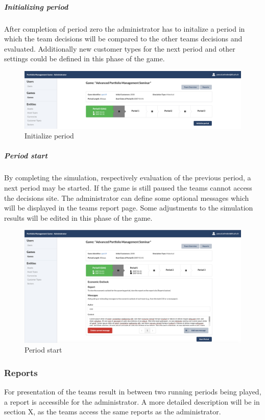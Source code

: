 \subparagraph{Initializing period}
After completion of period zero the administrator has to initalize a period in which the team decisions will be compared to the other teams decisions and evaluated. Additionally new customer types for the next period and other settings could be defined in this phase of the game.
\begin{figure}[h!]
  \centering
  \includegraphics[scale=0.2]{img/application-overview/administrator/08_period_initialization.png}
  \caption{Initialize period}
\end{figure}


\subparagraph{Period start}
By completing the simulation, respectively evaluation of the previous period, a next period may be started. If the game is still paused the teams cannot access the decisions site. The administrator can define some optional messages which will be displayed in the teams report page. Some adjustments to the simulation results will be edited in this phase of the game.
\begin{figure}[h!]
  \centering
  \includegraphics[scale=0.2]{img/application-overview/administrator/09_period_start.png}
  \caption{Period start}
\end{figure}

\subsubsection{Reports}
For presentation of the teams result in between two running periods being played, a report is accessible for the administrator. A more detailed description will be in section X, as the teams access the same reports as the administrator.


